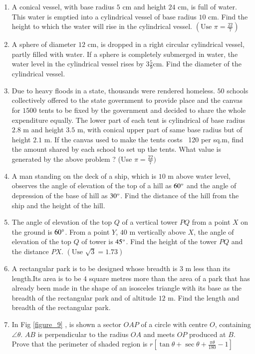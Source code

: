 \documentclass[12pt,-letter paper]{article}
\theoremstyle{remark}
\providecommand{\sbrak}[1]{\ensuremath{{}\left[#1\right]}}
\providecommand{\brak}[1]{\ensuremath{\left(#1\right)}}
\begin{document}
\begin{enumerate}
\begin{figure}[H]
      \caption{}
      \label{figure_8}
\end{figure} 
\item  A conical vessel, with base radius $5$ cm and height $24$ cm, is full of water. This water is emptied into a cylindrical vessel of base radius $10$ cm. Find the height to which the water will rise in the cylindrical vessel. $\brak{\text{Use } \pi  = \frac{22}{7}}$\\
\item  A sphere of diameter $12$ cm, is dropped in a right circular cylindrical vessel, partly filled with water. If a sphere is completely submerged in water, the water level in the cylindrical vessel rises by $ 3 \frac{5}{9}$cm. Find the diameter of the cylindrical vessel.\\  
\item  Due to heavy floods in a state, thousands were rendered homeless. $50$ schools collectively offered to the state government to provide place and the canvas for $1500$ tents to be fixed by the government and decided to share the whole expenditure equally. The lower part of each tent is cylindrical of base radius $2.8$ m and height $3.5$ m, with conical upper part of same base radius but of height $2.1$ m. If the canvas used to make the tents costs \rupee~120 per sq.m, find the amount shared by each school to set up the tents. What value is generated by the above problem ? (Use $ \pi = \frac{22}{7} ) $\\
\item  A man standing on the deck of a ship, which is $10$ m above water level, observes the angle of elevation of the top of a hill as $ 60\degree $ and the angle of depression of the base of hill as $ 30 \degree $. Find the distance of the hill from the ship and the height of the hill.\\
\item The angle of elevation of the top $Q$ of a vertical tower $PQ$ from a point $X$ on the ground is $ 60\degree $. From a point $Y$, $40$ m vertically above $X$, the angle of elevation of the top $Q$ of tower is $ 45 \degree $. Find the height of the tower $PQ$ and the distance $PX$. $\brak{\text{Use }\sqrt{3} = 1.73}$\\
\item A rectangular park is to be designed whose breadth is $3$ m less than its length.Its area is to be $4$ square metres more than the area of a park that has already been made in the shape of an isosceles triangle with its base as the breadth of the rectangular park and of altitude $12$ m. Find the length and breadth of the rectangular park.\\
\item In Fig  \ref{figure_9} , is shown a sector $OAP$ of a circle with centre $O$, containing $\angle \theta$. $AB$ is perpendicular to the radius $OA$ and meets $OP$ produced at $B$. Prove that the perimeter of shaded region is $r\sbrak{\tan \theta + \sec \theta + \frac{\pi \theta}{180}-1}$ \\


\end{enumerate}
\end{document}
